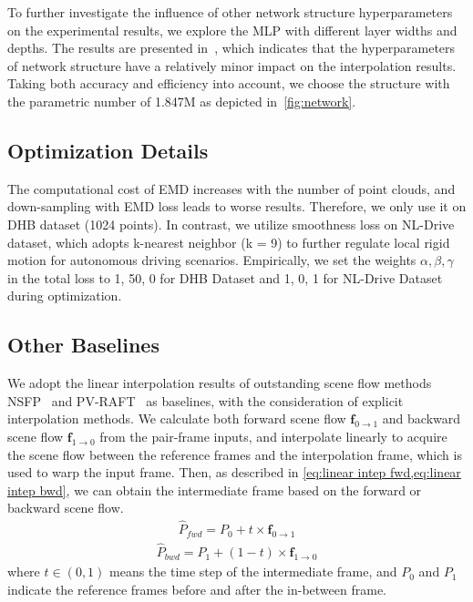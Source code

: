 \documentclass[10pt,twocolumn,letterpaper]{article}
\begin{document}
To further investigate the influence of other network structure hyperparameters on the experimental results, we explore the MLP with different layer widths and depths. The results are presented in~, which indicates that the hyperparameters of network structure have a relatively minor impact on the interpolation results. Taking both accuracy and efficiency into account, we choose the structure with the parametric number of 1.847M as depicted in~\cref{fig:network}.


\subsection{Optimization Details}
The computational cost of EMD increases with the number of point clouds, and down-sampling with EMD loss leads to worse results. Therefore, we only use it on DHB dataset (1024 points). In contrast, we utilize smoothness loss on NL-Drive dataset, which adopts k-nearest neighbor (k = 9) to further regulate local rigid motion for autonomous driving scenarios. Empirically, we set the weights $\alpha, \beta, \gamma$ in the total loss to 1, 50, 0 for DHB Dataset and 1, 0, 1 for NL-Drive Dataset during optimization.  

 

\subsection{Other Baselines}
We adopt the linear interpolation results of outstanding scene flow methods NSFP~\cite{li2021neuralSF} and PV-RAFT~\cite{wei2021pv} as baselines, with the consideration of explicit interpolation methods. We calculate both forward scene flow $\boldsymbol{f}_{0 \rightarrow 1}$ and backward scene flow $\boldsymbol{f}_{1 \rightarrow 0}$ from the pair-frame inputs, and interpolate linearly to acquire the scene flow between the reference frames and the interpolation frame, which is used to warp the input frame. Then, as described in \cref{eq:linear intep fwd,eq:linear intep bwd}, we can obtain the intermediate frame based on the forward or backward scene flow.
\begin{equation}
\label{eq:linear intep fwd}
\begin{split}
    \hat{P}_{fwd}=P_{0}+t \times \boldsymbol{f}_{0 \rightarrow 1}
\end{split}
\end{equation}
\vspace{-0.5cm}
\begin{equation}
\label{eq:linear intep bwd}
\begin{split}
    \hat{P}_{bwd}=P_{1}+(1-t) \times \boldsymbol{f}_{1 \rightarrow 0}
\end{split}
\end{equation}
where $t \in (0,1)$ means the time step of the intermediate frame, and $P_0$ and $P_1$ indicate the reference frames before and after the in-between frame. 
\end{document}
